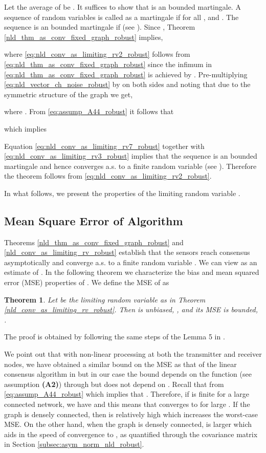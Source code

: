 \documentclass[onecolumn, draft, 12pt]{IEEEtran}
\newtheorem{thm}{Theorem}
\begin{document}
\begin{IEEEproof}
Let the average of  be . It suffices to show that  is an  bounded martingale. A sequence of random variables  is called as a martingale if for all ,  and . The sequence  is an  bounded martingale if  (see \cite[pp. 110]{David1991}). Since , Theorem \ref{nld_thm_as_conv_fixed_graph_robust} implies,


where \eqref{eq:nld_conv_as_limiting_rv2_robust} follows from \eqref{eq:nld_thm_as_conv_fixed_graph_robust} since the infimum in \eqref{eq:nld_thm_as_conv_fixed_graph_robust} is achieved by . Pre-multiplying \eqref{eq:nld_vector_ch_noise_robust} by  on both sides and noting that  due to the symmetric structure of the graph we get, 


where . From \eqref{eq:assump_A44_robust} it follows that

which implies

Equation \eqref{eq:nld_conv_as_limiting_rv7_robust} together with \eqref{eq:nld_conv_as_limiting_rv3_robust} implies that the sequence  is an  bounded martingale and hence converges a.s. to a finite random variable  (see \cite[Theorem 2.6.1]{Nevelson1973}). Therefore the theorem follows from \eqref{eq:nld_conv_as_limiting_rv2_robust}.
\end{IEEEproof}

In what follows, we present the properties of the limiting random variable .

\subsection{Mean Square Error of  Algorithm}\label{subsec:mse_nld_robust}
Theorems \ref{nld_thm_as_conv_fixed_graph_robust} and \ref{nld_conv_as_limiting_rv_robust} establish that the sensors reach consensus asymptotically and converge a.s. to a finite random variable  . We can view  as an estimate of  . In the following theorem we characterize the bias and mean squared error (MSE) properties of .  We define the MSE of  as 

\begin{thm} \label{nld_limiting_rv_mse_robust}
Let  be the limiting random variable as in Theorem  \ref{nld_conv_as_limiting_rv_robust}. Then  is unbiased, , and its MSE is bounded, .
\end{thm}
The proof is obtained by following the same steps of the Lemma 5 in \cite{KarMoura2009}. 

We point out that with non-linear processing at both the transmitter and receiver nodes, we have obtained a similar bound on the MSE  as that of the linear consensus algorithm in \cite{KarMoura2009} but in our case the bound depends on the function  (see assumption \textbf{(A2)}) through  but does not depend on . Recall that  from \eqref{eq:assump_A44_robust} which implies that . Therefore, if  is finite for a large connected network, we have  and this means that  converges to  for large . If the graph is densely connected, then  is relatively high which increases the worst-case MSE. On the other hand, when the graph is densely connected,  is larger which aids in the speed of convergence to , as quantified through the covariance matrix in Section \ref{subsec:asym_norm_nld_robust}. 
\end{document}
